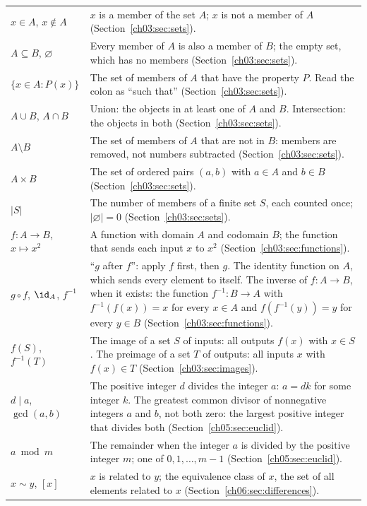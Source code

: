 \begin{longtable}{@{}p{1.25in}p{3.95in}@{}}
$x\in A$, $x\notin A$ & $x$ is a member of the set $A$; $x$ is not a member of $A$ (Section~\ref{ch03:sec:sets}).\\
$A\subseteq B$, $\varnothing$ & Every member of $A$ is also a member of $B$; the empty set, which has no members (Section~\ref{ch03:sec:sets}).\\
$\{x\in A:P(x)\}$ & The set of members of $A$ that have the property $P$. Read the colon as ``such that'' (Section~\ref{ch03:sec:sets}).\\
$A\cup B$, $A\cap B$ & Union: the objects in at least one of $A$ and $B$. Intersection: the objects in both (Section~\ref{ch03:sec:sets}).\\
$A\setminus B$ & The set of members of $A$ that are not in $B$: members are removed, not numbers subtracted (Section~\ref{ch03:sec:sets}).\\
$A\times B$ & The set of ordered pairs $(a,b)$ with $a\in A$ and $b\in B$ (Section~\ref{ch03:sec:sets}).\\
$|S|$ & The number of members of a finite set $S$, each counted once; $|\varnothing|=0$ (Section~\ref{ch03:sec:sets}).\\
$f:A\to B$, $x\mapsto x^2$ & A function with domain $A$ and codomain $B$; the function that sends each input $x$ to $x^2$ (Section~\ref{ch03:sec:functions}).\\
$g\circ f$, $\id_A$, $f^{-1}$ & ``$g$ after $f$'': apply $f$ first, then $g$. The identity function on $A$, which sends every element to itself. The inverse of $f:A\to B$, when it exists: the function $f^{-1}:B\to A$ with $f^{-1}(f(x))=x$ for every $x\in A$ and $f(f^{-1}(y))=y$ for every $y\in B$ (Section~\ref{ch03:sec:functions}).\\
$f(S)$, $f^{-1}(T)$ & The image of a set $S$ of inputs: all outputs $f(x)$ with $x\in S$. The preimage of a set $T$ of outputs: all inputs $x$ with $f(x)\in T$ (Section~\ref{ch03:sec:images}).\\
$d\mid a$, $\gcd(a,b)$ & The positive integer $d$ divides the integer $a$: $a=dk$ for some integer $k$. The greatest common divisor of nonnegative integers $a$ and $b$, not both zero: the largest positive integer that divides both (Section~\ref{ch05:sec:euclid}).\\
$a\bmod m$ & The remainder when the integer $a$ is divided by the positive integer $m$; one of $0,1,\ldots,m-1$ (Section~\ref{ch05:sec:euclid}).\\
$x\sim y$, $[x]$ & $x$ is related to $y$; the equivalence class of $x$, the set of all elements related to $x$ (Section~\ref{ch06:sec:differences}).\\

\end{longtable}
